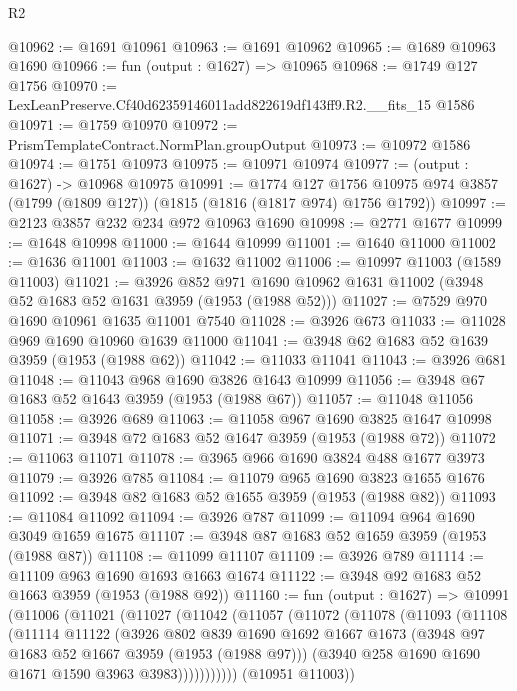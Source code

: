 \begin{lexlean}{R2}
\begin{coremodule}
@10962 := @1691 @10961
@10963 := @1691 @10962
@10965 := @1689 @10963 @1690
@10966 := fun (output : @1627) => @10965
@10968 := @1749 @127 @1756
@10970 := LexLeanPreserve.Cf40d62359146011add822619df143ff9.R2.__fits_15 @1586
@10971 := @1759 @10970
@10972 := PrismTemplateContract.NormPlan.groupOutput
@10973 := @10972 @1586
@10974 := @1751 @10973
@10975 := @10971 @10974
@10977 := (output : @1627) -> @10968 @10975
@10991 := @1774
    @127
    @1756
    @10975
    @974
    @3857
    (@1799 (@1809 @127))
    (@1815 (@1816 (@1817 @974) @1756 @1792))
@10997 := @2123 @3857 @232 @234 @972 @10963 @1690
@10998 := @2771 @1677
@10999 := @1648 @10998
@11000 := @1644 @10999
@11001 := @1640 @11000
@11002 := @1636 @11001
@11003 := @1632 @11002
@11006 := @10997 @11003 (@1589 @11003)
@11021 := @3926
    @852
    @971
    @1690
    @10962
    @1631
    @11002
    (@3948 @52 @1683 @52 @1631 @3959 (@1953 (@1988 @52)))
@11027 := @7529 @970 @1690 @10961 @1635 @11001 @7540
@11028 := @3926 @673
@11033 := @11028 @969 @1690 @10960 @1639 @11000
@11041 := @3948 @62 @1683 @52 @1639 @3959 (@1953 (@1988 @62))
@11042 := @11033 @11041
@11043 := @3926 @681
@11048 := @11043 @968 @1690 @3826 @1643 @10999
@11056 := @3948 @67 @1683 @52 @1643 @3959 (@1953 (@1988 @67))
@11057 := @11048 @11056
@11058 := @3926 @689
@11063 := @11058 @967 @1690 @3825 @1647 @10998
@11071 := @3948 @72 @1683 @52 @1647 @3959 (@1953 (@1988 @72))
@11072 := @11063 @11071
@11078 := @3965 @966 @1690 @3824 @488 @1677 @3973
@11079 := @3926 @785
@11084 := @11079 @965 @1690 @3823 @1655 @1676
@11092 := @3948 @82 @1683 @52 @1655 @3959 (@1953 (@1988 @82))
@11093 := @11084 @11092
@11094 := @3926 @787
@11099 := @11094 @964 @1690 @3049 @1659 @1675
@11107 := @3948 @87 @1683 @52 @1659 @3959 (@1953 (@1988 @87))
@11108 := @11099 @11107
@11109 := @3926 @789
@11114 := @11109 @963 @1690 @1693 @1663 @1674
@11122 := @3948 @92 @1683 @52 @1663 @3959 (@1953 (@1988 @92))
@11160 := fun (output : @1627) =>
  @10991
    (@11006
      (@11021
        (@11027
          (@11042
            (@11057
              (@11072
                (@11078
                  (@11093
                    (@11108
                      (@11114
                        @11122
                        (@3926
                          @802
                          @839
                          @1690
                          @1692
                          @1667
                          @1673
                          (@3948 @97 @1683 @52 @1667 @3959 (@1953 (@1988 @97)))
                          (@3940 @258 @1690 @1690 @1671 @1590 @3963 @3983)))))))))))
      (@10951 @11003))

\end{coremodule}
\end{lexlean}

